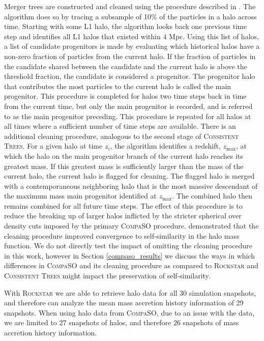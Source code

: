 Merger trees are constructed and cleaned using the procedure described in \cite{CompaSO_Merger_Trees}. The algorithm does so by tracing a subsample of 10\% of the particles in a halo across time. Starting with some L1 halo, the algorithm looks back one previous time step and identifies all L1 halos that existed within $4$ Mpc. Using this list of halos, a list of candidate progenitors is made by evaluating which historical halos have a non-zero fraction of particles from the current halo. If the fraction of particles in the candidate shared between the candidate and the current halo is above the threshold fraction, the candidate is considered a progenitor. The progenitor halo that contributes the most particles to the current halo is called the main progenitor. This procedure is completed for halos two time steps back in time from the current time, but only the main progenitor is recorded, and is referred to as the main progenitor preceding. This procedure is repeated for all halos at all times where a sufficient number of time steps are available. There is an additional cleaning procedure, analogous to the second stage of \textsc{Consistent Trees}. For a given halo at time $z_i$, the algorithm identifies a redshift, $z_{\mathrm{max}}$, at which the halo on the main progenitor branch of the current halo reaches its greatest mass. If this greatest mass is sufficiently larger than the mass of the current halo, the current halo is flagged for cleaning. The flagged halo is merged with a contemporaneous neighboring halo that is the most massive descendant of the maximum mass main progenitor identified at $z_{\mathrm{max}}$. The combined halo then remains combined for all future time steps. The effect of this procedure is to reduce the breaking up of larger halos inflicted by the stricter spherical over density cuts imposed by the primary \textsc{CompaSO} procedure. \cite{Maleubre_2024} demonstrated that the cleaning procedure improved convergence to self-similarity in the halo mass function. We do not directly test the impact of omitting the cleaning procedure in this work, however in Section \ref{compaso_results} we discuss the ways in which differences in \textsc{CompaSO} and its cleaning procedure as compared to \textsc{Rockstar} and \textsc{Consistent Trees} might impact the preservation of self-similarity.

With \textsc{Rockstar} we are able to retrieve halo data for all 30 simulation snapshots, and therefore can analyze the mean mass accretion history information of 29 snapshots. When using halo data from \textsc{CompaSO}, due to an issue with the data, we are limited to 27 snapshots of halos, and therefore 26 snapshots of mass accretion history information. 

